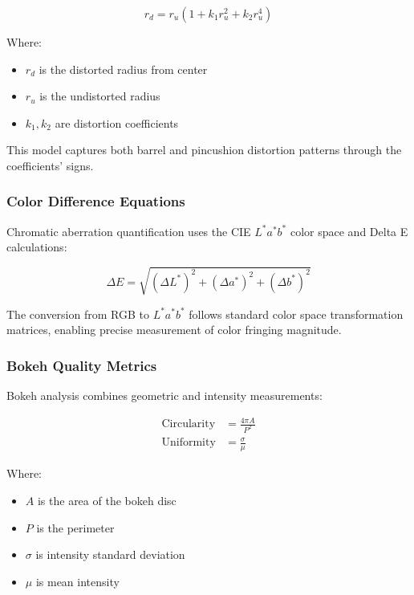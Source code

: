 \begin{equation}
r_d = r_u \left(1 + k_1 r_u^2 + k_2 r_u^4\right)
\end{equation}

Where:
\begin{itemize}
    \item \( r_d \) is the distorted radius from center
    \item \( r_u \) is the undistorted radius
    \item \( k_1, k_2 \) are distortion coefficients
\end{itemize}

This model captures both barrel and pincushion distortion patterns through the coefficients' signs.

\subsubsection{Color Difference Equations}
Chromatic aberration quantification uses the CIE \( L^*a^*b^* \) color space and Delta E calculations:

\begin{equation}
\Delta E = \sqrt{(\Delta L^*)^2 + (\Delta a^*)^2 + (\Delta b^*)^2}
\end{equation}

The conversion from RGB to \( L^*a^*b^* \) follows standard color space transformation matrices, enabling precise measurement of color fringing magnitude.

\subsubsection{Bokeh Quality Metrics}
Bokeh analysis combines geometric and intensity measurements:

\begin{align}
\text{Circularity} &= \frac{4\pi A}{P^2} \\
\text{Uniformity} &= \frac{\sigma}{\mu}
\end{align}

Where:
\begin{itemize}
    \item \( A \) is the area of the bokeh disc
    \item \( P \) is the perimeter
    \item \( \sigma \) is intensity standard deviation
    \item \( \mu \) is mean intensity
\end{itemize}


